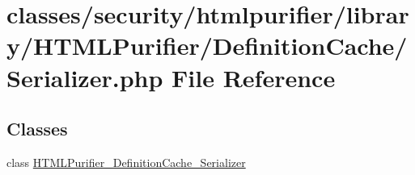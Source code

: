 \hypertarget{Serializer_8php}{\section{classes/security/htmlpurifier/library/\+H\+T\+M\+L\+Purifier/\+Definition\+Cache/\+Serializer.php File Reference}
\label{Serializer_8php}
}
\subsection*{Classes}
\begin{DoxyCompactItemize}
\item 
class \hyperlink{classHTMLPurifier__DefinitionCache__Serializer}{H\+T\+M\+L\+Purifier\+\_\+\+Definition\+Cache\+\_\+\+Serializer}
\end{DoxyCompactItemize}

